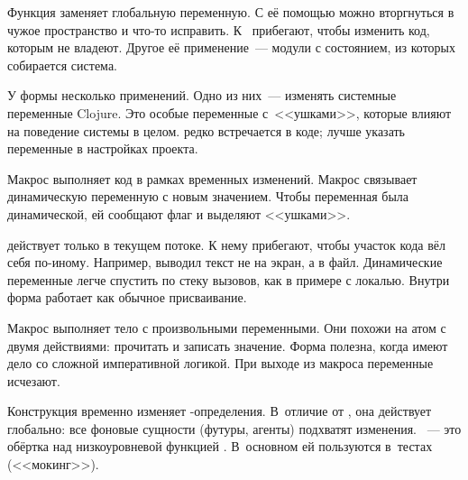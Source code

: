 Функция  заменяет глобальную переменную. С её помощью можно
вторгнуться в чужое пространство и что-то исправить. К~
прибегают, чтобы изменить код, которым не владеют. Другое её применение~---
модули с состоянием, из которых собирается система.

У формы  несколько применений. Одно из них~--- изменять системные
переменные Clojure. Это особые переменные с~<<ушками>>, которые влияют на
поведение системы в целом.  редко встречается в коде; лучше указать
переменные в настройках проекта.

Макрос  выполняет код в рамках временных изменений. Макрос
связывает динамическую переменную с новым значением. Чтобы переменная была
динамической, ей сообщают флаг  и выделяют <<ушками>>.

 действует только в текущем потоке. К нему прибегают, чтобы
участок кода вёл себя по-иному. Например, выводил текст не на экран, а в
файл. Динамические переменные легче спустить по стеку вызовов, как в примере с
локалью. Внутри  форма  работает как обычное
присваивание.

Макрос  выполняет тело с произвольными переменными. Они
похожи на атом с двумя действиями: прочитать и записать значение. Форма полезна,
когда имеют дело со сложной императивной логикой. При выходе из макроса
переменные исчезают.

Конструкция  временно изменяет
-оп\-ре\-де\-ле\-ния. В~отличие от , она действует глобально:
все фоновые сущности (футуры, агенты) подхватят
изменения. ~--- это обёртка над низкоуровневой функцией
. В~основном ей пользуются в~тестах (<<мокинг>>).

